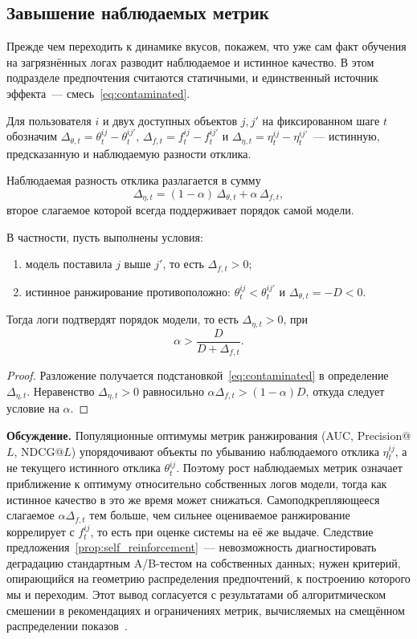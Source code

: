 \subsection{Завышение наблюдаемых метрик}
\label{subsec:self_reinforcement}

Прежде чем переходить к динамике вкусов, покажем, что уже сам факт обучения на
загрязнённых логах разводит наблюдаемое и истинное качество. В этом подразделе
предпочтения считаются статичными, и единственный источник эффекта~---
смесь~\eqref{eq:contaminated}.

Для пользователя $i$ и двух доступных объектов $j,j'$ на фиксированном шаге
$t$ обозначим
$\Delta_{\theta,t}=\theta_t^{ij}-\theta_t^{ij'}$,
$\Delta_{f,t}=f_t^{ij}-f_t^{ij'}$ и
$\Delta_{\eta,t}=\eta_t^{ij}-\eta_t^{ij'}$~--- истинную, предсказанную и
наблюдаемую разности отклика.

\begin{proposition}[Самоподкрепление]
\label{prop:self_reinforcement}
Наблюдаемая разность отклика разлагается в сумму
\[
    \Delta_{\eta,t}
    =(1-\alpha)\,\Delta_{\theta,t}+\alpha\,\Delta_{f,t},
\]
второе слагаемое которой всегда поддерживает порядок самой модели.

В частности, пусть выполнены условия:
\begin{enumerate}[label=\textup{(\arabic*)}, leftmargin=2em]
    \item модель поставила $j$ выше $j'$, то есть $\Delta_{f,t}>0$;
    \item истинное ранжирование противоположно:
    $\theta_t^{ij}<\theta_t^{ij'}$ и $\Delta_{\theta,t}=-D<0$.
\end{enumerate}
Тогда логи подтвердят порядок модели, то есть $\Delta_{\eta,t}>0$, при
\[
    \alpha>\frac{D}{D+\Delta_{f,t}}.
\]
\end{proposition}

\begin{proof}
Разложение получается подстановкой~\eqref{eq:contaminated}
в определение $\Delta_{\eta,t}$. Неравенство
$\Delta_{\eta,t}>0$ равносильно
$\alpha\Delta_{f,t}>(1-\alpha)D$, откуда следует условие на $\alpha$.
\end{proof}

\textbf{Обсуждение.} Популяционные оптимумы метрик ранжирования (AUC,
Precision@$L$, NDCG@$L$) упорядочивают объекты по убыванию наблюдаемого отклика
$\eta_t^{ij}$, а не текущего истинного отклика $\theta_t^{ij}$. Поэтому рост
наблюдаемых метрик означает
приближение к оптимуму относительно собственных логов модели, тогда как истинное
качество в это же время может снижаться. Самоподкрепляющееся слагаемое
$\alpha\Delta_{f,t}$ тем больше, чем сильнее оцениваемое ранжирование
коррелирует с $f_t^{ij}$, то есть при оценке системы на её же выдаче. Следствие
предложения~\ref{prop:self_reinforcement}~--- невозможность диагностировать
деградацию стандартным A/B-тестом на собственных данных; нужен критерий,
опирающийся на геометрию распределения предпочтений, к построению которого мы и
переходим. Этот вывод согласуется с результатами об алгоритмическом смешении в
рекомендациях и ограничениях метрик, вычисляемых на смещённом распределении
показов~\cite{chaney2018,
krichene2020, bottou2013}.

